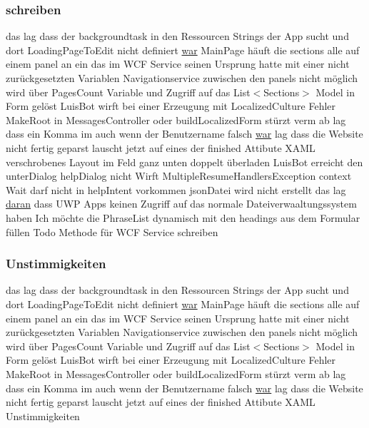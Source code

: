 \subsubsection{\texorpdfstring{schreiben}{schreiben}}
{\footnotesize\ttfamily das lag dass der backgroundtask in den Ressourcen Strings der App sucht und dort Loading\+Page\+To\+Edit nicht definiert \mbox{\hyperlink{_r_e_a_d_m_e_8txt_a2a72fc7da943588cba8c302409b22e53}{war}} Main\+Page häuft die sections alle auf einem panel an ein das im W\+CF Service seinen Ursprung hatte mit einer nicht zurückgesetzten Variablen Navigationservice zuwischen den panels nicht möglich wird über Pages\+Count Variable und Zugriff auf das List$<$Sections$>$ Model in Form gelöst Luis\+Bot wirft bei einer Erzeugung mit Localized\+Culture Fehler Make\+Root in Messages\+Controller oder build\+Localized\+Form stürzt verm ab lag dass ein Komma im auch wenn der Benutzername falsch \mbox{\hyperlink{_r_e_a_d_m_e_8txt_a2a72fc7da943588cba8c302409b22e53}{war}} lag dass die Website nicht fertig geparst lauscht jetzt auf eines der finished Attibute X\+A\+ML verschrobenes Layout im Feld ganz unten doppelt überladen Luis\+Bot erreicht den unter\+Dialog help\+Dialog nicht Wirft Multiple\+Resume\+Handlers\+Exception context Wait darf nicht in help\+Intent vorkommen json\+Datei wird nicht erstellt das lag \mbox{\hyperlink{_r_e_a_d_m_e_8txt_a135543df2f8a787ac2ddeaf87194562c}{daran}} dass U\+WP Apps keinen Zugriff auf das normale Dateiverwaaltungssystem haben Ich möchte die Phrase\+List dynamisch mit den headings aus dem Formular füllen Todo Methode für W\+CF Service schreiben}

\mbox{\label{_r_e_a_d_m_e_8txt_ac0dcc138103869e0359e06225049e770}} 
\subsubsection{\texorpdfstring{Unstimmigkeiten}{Unstimmigkeiten}}
{\footnotesize\ttfamily das lag dass der backgroundtask in den Ressourcen Strings der App sucht und dort Loading\+Page\+To\+Edit nicht definiert \mbox{\hyperlink{_r_e_a_d_m_e_8txt_a2a72fc7da943588cba8c302409b22e53}{war}} Main\+Page häuft die sections alle auf einem panel an ein das im W\+CF Service seinen Ursprung hatte mit einer nicht zurückgesetzten Variablen Navigationservice zuwischen den panels nicht möglich wird über Pages\+Count Variable und Zugriff auf das List$<$Sections$>$ Model in Form gelöst Luis\+Bot wirft bei einer Erzeugung mit Localized\+Culture Fehler Make\+Root in Messages\+Controller oder build\+Localized\+Form stürzt verm ab lag dass ein Komma im auch wenn der Benutzername falsch \mbox{\hyperlink{_r_e_a_d_m_e_8txt_a2a72fc7da943588cba8c302409b22e53}{war}} lag dass die Website nicht fertig geparst lauscht jetzt auf eines der finished Attibute X\+A\+ML Unstimmigkeiten}

